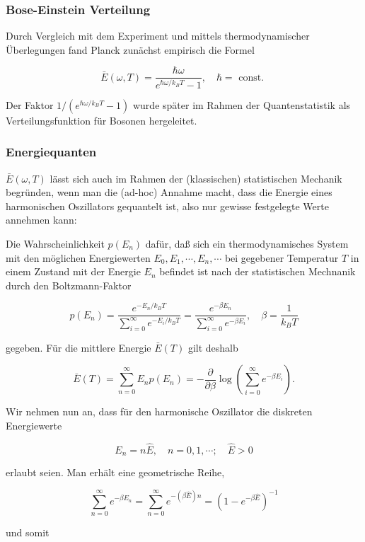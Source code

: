 \documentclass[10pt, letterpaper]{article}
\begin{document}
\subsubsection*{Bose-Einstein Verteilung}
Durch Vergleich mit dem Experiment und mittels thermodynamischer Überlegungen fand Planck zunächst empirisch die Formel

$$
\bar{E}(\omega, T)=\frac{\hbar \omega}{e^{\hbar \omega / k_{B} T}-1}, \quad \hbar=\text { const. }
$$

Der Faktor $1 /\left(e^{\hbar \omega / k_{B} T}-1\right)$ wurde später im Rahmen der Quantenstatistik als Verteilungsfunktion für Bosonen hergeleitet.



\subsubsection*{Energiequanten}
$\bar{E}(\omega, T)$ lässt sich auch im Rahmen der (klassischen) statistischen Mechanik begründen, wenn man die (ad-hoc) Annahme macht, dass die Energie eines harmonischen Oszillators gequantelt ist, also nur gewisse festgelegte Werte annehmen kann:

Die Wahrscheinlichkeit $p\left(E_{n}\right)$ dafür, daß sich ein thermodynamisches System mit den möglichen Energiewerten $E_{0}, E_{1}, \cdots, E_{n}, \cdots$ bei gegebener Temperatur $T$ in einem Zustand mit der Energie $E_{n}$ befindet ist nach der statistischen Mechnanik durch den Boltzmann-Faktor

$$
p\left(E_{n}\right)=\frac{e^{-E_{n} / k_{B} T}}{\sum_{i=0}^{\infty} e^{-E_{i} / k_{B} T}}=\frac{e^{-\beta E_{n}}}{\sum_{i=0}^{\infty} e^{-\beta E_{i}}}, \quad \beta=\frac{1}{k_{B} T}
$$

gegeben. Für die mittlere Energie $\bar{E}(T)$ gilt deshalb

$$
\bar{E}(T)=\sum_{n=0}^{\infty} E_{n} p\left(E_{n}\right)=-\frac{\partial}{\partial \beta} \log \left(\sum_{i=0}^{\infty} e^{-\beta E_{i}}\right) .
$$

Wir nehmen nun an, dass für den harmonische Oszillator die diskreten Energiewerte

$$
E_{n}=n \hat{E}, \quad n=0,1, \cdots ; \quad \hat{E}>0
$$

erlaubt seien. Man erhält eine geometrische Reihe,

$$
\sum_{n=0}^{\infty} e^{-\beta E_{n}}=\sum_{n=0}^{\infty} e^{-(\beta \hat{E}) n}=\left(1-e^{-\beta \hat{E}}\right)^{-1}
$$

und somit
\end{document}
